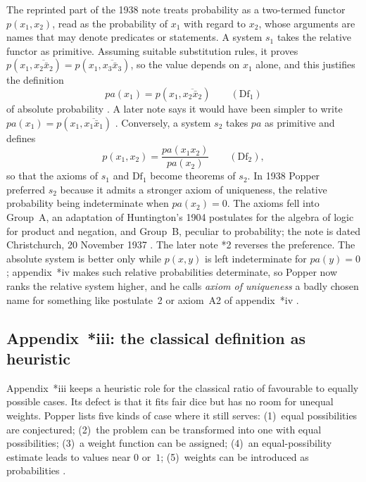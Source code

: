 The reprinted part of the 1938 note treats probability as a two-termed
functor \(p(x_1,x_2)\), read as the probability of \(x_1\) with regard to
\(x_2\), whose arguments are names that may denote predicates or
statements. A system \(s_1\) takes the relative functor as primitive.
Assuming suitable substitution rules, it proves
\(p(x_1,\overline{x_2\bar x_2})=p(x_1,\overline{x_3\bar x_3})\), so the
value depends on \(x_1\) alone, and this justifies the definition
\[
 \textit{pa}(x_1)=p(x_1,\overline{x_2\bar x_2})\qquad(\mathrm{Df}_1)
\]
of absolute probability \parencite[appendix~*ii, pp.~321--322]{Popper2002LogicDiscoveryUI}.
A later note says it would have been simpler to write
\(\textit{pa}(x_1)=p(x_1,\overline{x_1\bar x_1})\)
\parencite[appendix~*ii, note~5, p.~322]{Popper2002LogicDiscoveryUI}.
Conversely, a system \(s_2\) takes \(\textit{pa}\) as primitive and
defines
\[
 p(x_1,x_2)=\frac{\textit{pa}(x_1x_2)}{\textit{pa}(x_2)}\qquad(\mathrm{Df}_2),
\]
so that the axioms of \(s_1\) and \(\mathrm{Df}_1\) become theorems of
\(s_2\). In 1938 Popper preferred \(s_2\) because it admits a stronger
axiom of uniqueness, the relative probability being indeterminate when
\(\textit{pa}(x_2)=0\). The axioms fell into Group~A, an adaptation of
Huntington's 1904 postulates for the algebra of logic for product and
negation, and Group~B, peculiar to probability; the note is dated
Christchurch, 20 November 1937
\parencite[appendix~*ii, pp.~322--324]{Popper2002LogicDiscoveryUI}.
The later note *2 reverses the preference. The absolute system is better
only while \(p(x,y)\) is left indeterminate for \(\textit{pa}(y)=0\);
appendix~*iv makes such relative probabilities determinate, so Popper now
ranks the relative system higher, and he calls \emph{axiom of uniqueness}
a badly chosen name for something like postulate~2 or axiom~A2 of
appendix~*iv \parencite[appendix~*ii, note~*2, p.~323]{Popper2002LogicDiscoveryUI}.

\subsection{Appendix~*iii: the classical definition as heuristic}

Appendix~*iii keeps a heuristic role for the classical ratio of
favourable to equally possible cases. Its defect is that it fits fair
dice but has no room for unequal weights. Popper lists five kinds of
case where it still serves: (1)~equal possibilities are conjectured;
(2)~the problem can be transformed into one with equal possibilities;
(3)~a weight function can be assigned; (4)~an equal-possibility estimate
leads to values near \(0\) or~\(1\); (5)~weights can be introduced as
probabilities \parencite[appendix~*iii, pp.~325--326]{Popper2002LogicDiscoveryUI}.

